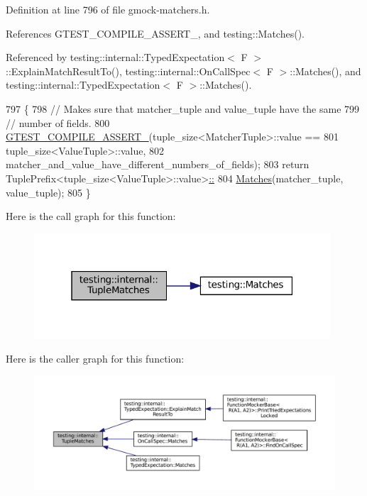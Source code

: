Definition at line 796 of file gmock-\/matchers.\+h.



References G\+T\+E\+S\+T\+\_\+\+C\+O\+M\+P\+I\+L\+E\+\_\+\+A\+S\+S\+E\+R\+T\+\_\+, and testing\+::\+Matches().



Referenced by testing\+::internal\+::\+Typed\+Expectation$<$ F $>$\+::\+Explain\+Match\+Result\+To(), testing\+::internal\+::\+On\+Call\+Spec$<$ F $>$\+::\+Matches(), and testing\+::internal\+::\+Typed\+Expectation$<$ F $>$\+::\+Matches().


\begin{DoxyCode}
797                                                  \{
798   \textcolor{comment}{// Makes sure that matcher\_tuple and value\_tuple have the same}
799   \textcolor{comment}{// number of fields.}
800   \hyperlink{gtest-port_8h_ae1f37dc71d5daa6fb49ca1b6047d4a8c}{GTEST\_COMPILE\_ASSERT\_}(tuple\_size<MatcherTuple>::value ==
801                         tuple\_size<ValueTuple>::value,
802                         matcher\_and\_value\_have\_different\_numbers\_of\_fields);
803   \textcolor{keywordflow}{return} TuplePrefix<tuple\_size<ValueTuple>::value>\hyperlink{namespacetesting_ad53b509ae9cd51040d67f668f99702ae}{::}
804 \hyperlink{namespacetesting_ad53b509ae9cd51040d67f668f99702ae}{      Matches}(matcher\_tuple, value\_tuple);
805 \}
\end{DoxyCode}
Here is the call graph for this function\+:
\nopagebreak
\begin{figure}[H]
\begin{center}
\leavevmode
\includegraphics[width=313pt]{namespacetesting_1_1internal_a10095d1e1c99369200072b39d657ebc4_cgraph}
\end{center}
\end{figure}
Here is the caller graph for this function\+:
\nopagebreak
\begin{figure}[H]
\begin{center}
\leavevmode
\includegraphics[width=350pt]{namespacetesting_1_1internal_a10095d1e1c99369200072b39d657ebc4_icgraph}
\end{center}
\end{figure}
